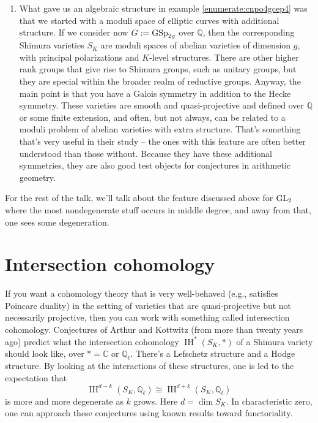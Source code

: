 \documentclass[reqno]{amsart} 
\begin{document}
\begin{enumerate}
\item\label{enumerate:cnpo4ghhcx} What gave us an algebraic structure in example \eqref{enumerate:cnpo4gcep4} was that we started with a moduli space of elliptic curves with additional structure.  If we consider now $G := \operatorname{GSp}_{2 g}$ over $\mathbb{Q}$, then the corresponding Shimura varieties $S_K$ are moduli spaces of abelian varieties of dimension $g$, with principal polarizations and $K$-level structures.  There are other higher rank groups that give rise to Shimura groups, such as unitary groups, but they are special within the broader realm of reductive groups.  Anyway, the main point is that you have a Galois symmetry in addition to the Hecke symmetry.  These varieties are smooth and quasi-projective and defined over $\mathbb{Q}$ or some finite extension, and often, but not always, can be related to a moduli problem of abelian varieties with extra structure.  That's something that's very useful in their study -- the ones with this feature are often better understood than those without.  Because they have these additional symmetries, they are also good test objects for conjectures in arithmetic geometry.
\end{enumerate}

For the rest of the talk, we'll talk about the feature discussed above for $\operatorname{GL}_2$ where the most nondegenerate stuff occurs in middle degree, and away from that, one sees some degeneration.

\section{Intersection cohomology}

If you want a cohomology theory that is very well-behaved (e.g., satisfies Poincare duality) in the setting of varieties that are quasi-projective but not necessarily projective, then you can work with something called intersection cohomology.  Conjectures of Arthur and Kottwitz (from more than twenty years ago) predict what the intersection cohomology $\operatorname{IH}^\ast(S_K, \ast)$ of a Shimura variety should look like, over $\ast = \mathbb{C}$ or $\mathbb{Q}_{\ell}$.  There's a Lefschetz structure and a Hodge structure.  By looking at the interactions of these structures, one is led to the expectation that
\begin{equation*}
  \operatorname{IH}^{d - k}(S_K, \mathbb{Q}_{\ell}) \cong \operatorname{IH}^{d + k}(S_K, \mathbb{Q}_{\ell})
\end{equation*}
is more and more degenerate as $k$ grows.  Here $d = \dim S_K$.  In characteristic zero, one can approach these conjectures using known results toward functoriality.
\end{document}
